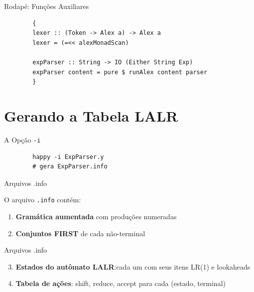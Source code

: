 \begin{frame}[fragile]{Rodapé: Funções Auxiliares}

    \begin{lstlisting}
        {
        lexer :: (Token -> Alex a) -> Alex a
        lexer = (=<< alexMonadScan)

        expParser :: String -> IO (Either String Exp)
        expParser content = pure $ runAlex content parser
        }
    \end{lstlisting}
\end{frame}


\section{Gerando a Tabela LALR}\label{gerando-a-tabela-lalr}

\begin{frame}[fragile]{A Opção \texttt{-i}}

    \begin{lstlisting}
        happy -i ExpParser.y
        # gera ExpParser.info
    \end{lstlisting}
\end{frame}

\begin{frame}[fragile]{Arquivos .info}

    O arquivo \texttt{.info} contém:

    \begin{enumerate}

        \item
        \textbf{Gramática aumentada} com produções numeradas
        \item
        \textbf{Conjuntos FIRST} de cada não-terminal
    \end{enumerate}
\end{frame}

\begin{frame}{Arquivos .info}

    \begin{enumerate}
        \setcounter{enumi}{2}

        \item
        \textbf{Estados do autômato LALR}:cada um com seus itens LR(1) e
        lookaheads
        \item
        \textbf{Tabela de ações}: shift, reduce, accept para cada (estado,
        terminal)
    \end{enumerate}
\end{frame}

